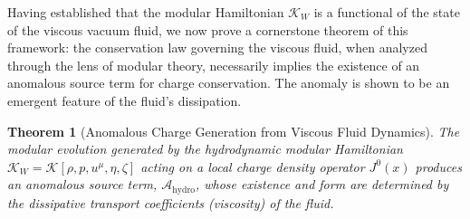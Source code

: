 \documentclass[11pt, letterpaper]{report}
\theoremstyle{plain} %
\newtheorem{theorem}{Theorem}[chapter]
\theoremstyle{definition} %
\theoremstyle{remark} %
\newcommand{\ModularK}{\mathcal{K}}
\begin{document}
Having established that the modular Hamiltonian $\ModularK_W$ is a functional of the state of the viscous vacuum fluid, we now prove a cornerstone theorem of this framework: the conservation law governing the viscous fluid, when analyzed through the lens of modular theory, necessarily implies the existence of an anomalous source term for charge conservation. The anomaly is shown to be an emergent feature of the fluid's dissipation.

\begin{theorem}[Anomalous Charge Generation from Viscous Fluid Dynamics]
\label{thm:anomaly_from_hydro}
The modular evolution generated by the hydrodynamic modular Hamiltonian $\ModularK_W = \mathcal{K}[\rho, p, u^\mu, \eta, \zeta]$ acting on a local charge density operator $J^0(x)$ produces an anomalous source term, $\mathcal{A}_{\text{hydro}}$, whose existence and form are determined by the dissipative transport coefficients (viscosity) of the fluid.
\end{theorem}
\end{document}
